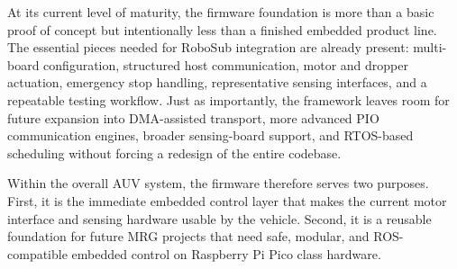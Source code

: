 \documentclass[conference]{IEEEtran}
\begin{document}
At its current level of maturity, the firmware foundation is more than a basic proof of concept but intentionally less than a finished embedded product line. The essential pieces needed for RoboSub integration are already present: multi-board configuration, structured host communication, motor and dropper actuation, emergency stop handling, representative sensing interfaces, and a repeatable testing workflow. Just as importantly, the framework leaves room for future expansion into DMA-assisted transport, more advanced PIO communication engines, broader sensing-board support, and RTOS-based scheduling without forcing a redesign of the entire codebase.

Within the overall AUV system, the firmware therefore serves two purposes. First, it is the immediate embedded control layer that makes the current motor interface and sensing hardware usable by the vehicle. Second, it is a reusable foundation for future MRG projects that need safe, modular, and ROS-compatible embedded control on Raspberry Pi Pico class hardware.
\end{document}
